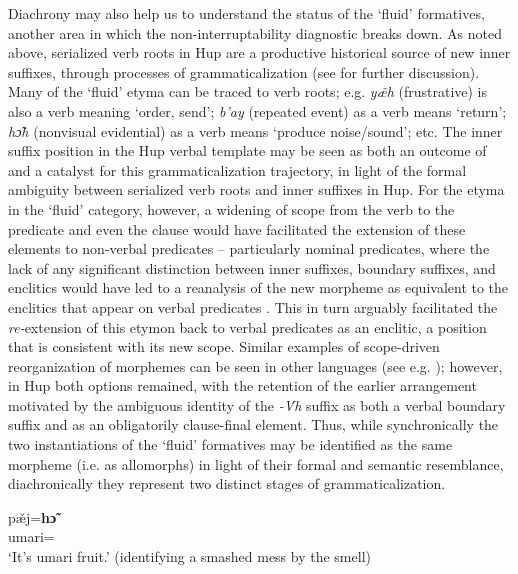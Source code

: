 \documentclass[output=paper]{langscibook}
\begin{document}
Diachrony may also help us to understand the status of the `fluid' formatives, another area in which the non-interruptability diagnostic breaks down. As noted above, serialized verb roots in Hup are a productive historical source of new inner suffixes, through processes of grammaticalization (see \citealt{Epps2022} for further discussion). Many of the `fluid' etyma can be traced to verb roots; e.g. \textit{y\~{æ}h} (frustrative) is also a verb meaning `order, send'; \textit{b'ay} (repeated event) as a verb means `return'; \textit{hɔ̃h} (nonvisual evidential) as a verb means `produce noise/sound'; etc. The inner suffix position in the Hup verbal template may be seen as both an outcome of and a catalyst for this grammaticalization trajectory, in light of the formal ambiguity between serialized verb roots and inner suffixes in Hup. For the etyma in the `fluid' category, however, a widening of scope from the verb to the predicate and even the clause would have facilitated the extension of these elements to non-verbal predicates – particularly nominal predicates, where the lack of any significant distinction between inner suffixes, boundary suffixes, and enclitics would have led to a reanalysis of the new morpheme as equivalent to the enclitics that appear on verbal predicates . This in turn arguably facilitated the \textit{re-}extension of this etymon back to verbal predicates as an enclitic, a position that is consistent with its new scope. Similar examples of scope-driven reorganization of morphemes can be seen in other languages (see e.g. \citealt{Mithun2000}); however, in Hup both options remained, with the retention of the earlier arrangement motivated by the ambiguous identity of the \textit{{}-\'{V}h} suffix as both a verbal boundary suffix and as an obligatorily clause-final element. Thus, while synchronically the two instantiations of the `fluid' formatives may be identified as the same morpheme (i.e. as allomorphs) in light of their formal and semantic resemblance, diachronically they represent two distinct stages of grammaticalization.

\ea\label{ex:hup:key:35} 
\gll pæ̌j=\textbf{hɔ̃}\\ 
umari=\Nonvis{}\\ 
\glt  `It's umari fruit.' (identifying a smashed mess by the smell)
\z 
\end{document}
